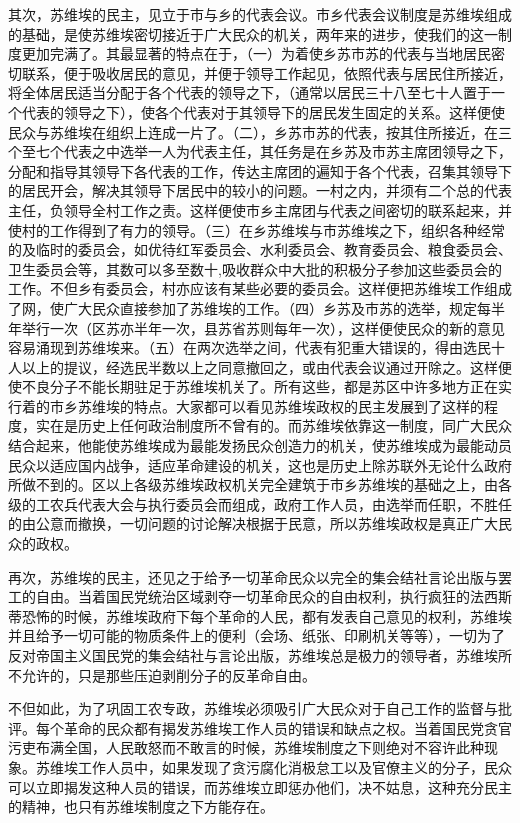 其次，苏维埃的民主，见立于市与乡的代表会议。市乡代表会议制度是苏维埃组成的基础，是使苏维埃密切接近于广大民众的机关，两年来的进步，使我们的这一制度更加完满了。其最显著的特点在于，（一）为着使乡苏市苏的代表与当地居民密切联系，便于吸收居民的意见，并便于领导工作起见，依照代表与居民住所接近，将全体居民适当分配于各个代表的领导之下，（通常以居民三十八至七十人置于一个代表的领导之下），使各个代表对于其领导下的居民发生固定的关系。这样便使民众与苏维埃在组织上连成一片了。（二），乡苏市苏的代表，按其住所接近，在三个至七个代表之中选举一人为代表主任，其任务是在乡苏及市苏主席团领导之下，分配和指导其领导下各代表的工作，传达主席团的遍知于各个代表，召集其领导下的居民开会，解决其领导下居民中的较小的问题。一村之内，并须有二个总的代表主任，负领导全村工作之责。这样便使市乡主席团与代表之间密切的联系起来，并使村的工作得到了有力的领导。（三）在乡苏维埃与市苏维埃之下，组织各种经常的及临时的委员会，如优待红军委员会、水利委员会、教育委员会、粮食委员会、卫生委员会等，其数可以多至数十,吸收群众中大批的积极分子参加这些委员会的工作。不但乡有委员会，村亦应该有某些必要的委员会。这样便把苏维埃工作组成了网，使广大民众直接参加了苏维埃的工作。（四）乡苏及市苏的选举，规定每半年举行一次（区苏亦半年一次，县苏省苏则每年一次），这样便使民众的新的意见容易涌现到苏维埃来。（五）在两次选举之间，代表有犯重大错误的，得由选民十人以上的提议，经选民半数以上之同意撤回之，或由代表会议通过开除之。这样便使不良分子不能长期驻足于苏维埃机关了。所有这些，都是苏区中许多地方正在实行着的市乡苏维埃的特点。大家都可以看见苏维埃政权的民主发展到了这样的程度，实在是历史上任何政治制度所不曾有的。而苏维埃依靠这一制度，同广大民众结合起来，他能使苏维埃成为最能发扬民众创造力的机关，使苏维埃成为最能动员民众以适应国内战争，适应革命建设的机关，这也是历史上除苏联外无论什么政府所做不到的。区以上各级苏维埃政权机关完全建筑于市乡苏维埃的基础之上，由各级的工农兵代表大会与执行委员会而组成，政府工作人员，由选举而任职，不胜任的由公意而撤换，一切问题的讨论解决根据于民意，所以苏维埃政权是真正广大民众的政权。

再次，苏维埃的民主，还见之于给予一切革命民众以完全的集会结社言论出版与罢工的自由。当着国民党统治区域剥夺一切革命民众的自由权利，执行疯狂的法西斯蒂恐怖的时候，苏维埃政府下每个革命的人民，都有发表自己意见的权利，苏维埃并且给予一切可能的物质条件上的便利（会场、纸张、印刷机关等等），一切为了反对帝国主义国民党的集会结社与言论出版，苏维埃总是极力的领导者，苏维埃所不允许的，只是那些压迫剥削分子的反革命自由。

不但如此，为了巩固工农专政，苏维埃必须吸引广大民众对于自己工作的监督与批评。每个革命的民众都有揭发苏维埃工作人员的错误和缺点之权。当着国民党贪官污吏布满全国，人民敢怒而不敢言的时候，苏维埃制度之下则绝对不容许此种现象。苏维埃工作人员中，如果发现了贪污腐化消极怠工以及官僚主义的分子，民众可以立即揭发这种人员的错误，而苏维埃立即惩办他们，决不姑息，这种充分民主的精神，也只有苏维埃制度之下方能存在。

